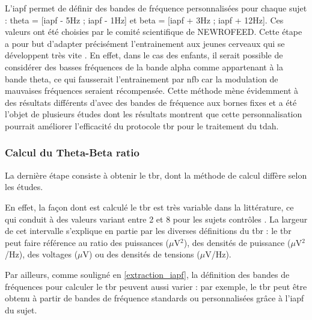 L'\gls{iapf} permet de définir des bandes de fréquence personnalisées pour chaque sujet : theta = [\gls{iapf} - 5Hz ; \gls{iapf} - 1Hz] et beta = [\gls{iapf} + 3Hz ; \gls{iapf} + 12Hz].
Ces valeurs ont été choisies par le comité scientifique de NEWROFEED.
Cette étape a pour but d'adapter précisément l'entrainement aux jeunes cerveaux qui se développent très vite \citep{Aurlien2004}. En effet, dans le cas des enfants, il serait possible de considérer 
des basses fréquences de la bande alpha comme appartenant à la bande theta, ce qui fausserait l'entrainement par \gls{nfb} car la modulation de mauvaises fréquences 
seraient récompensée. Cette méthode mène évidemment à des résultats différents d'avec des bandes de fréquence aux bornes fixes \citep{Arns2008, Vollebregt2015} et a été 
l'objet de plusieurs études \citep{Kaiser2001, Bazanova2006, Vollebregt2015} dont les résultats montrent que cette personnalisation pourrait améliorer l'efficacité du protocole
\gls{tbr} pour le traitement du \gls{tdah}.

\subsubsection{Calcul du Theta-Beta ratio} \label{tbr_computation}
La dernière étape consiste à obtenir le \gls{tbr}, dont la méthode de calcul diffère selon les études.

En effet, la façon dont est calculé le \gls{tbr} est très variable dans la littérature, ce qui conduit à des valeurs variant entre 2 et 8 pour les sujets contrôles \citep{Arns2012,
Schutte2017}. La largeur de cet intervalle s'explique en partie par les diverses définitions du \gls{tbr} : le \gls{tbr} peut faire référence au ratio
des puissances ($\mu$V$^2$), des densités de puissance ($\mu$V$^2$/Hz), des voltages ($\mu$V) ou des densités de tensions ($\mu$V/Hz).  

Par ailleurs, comme souligné en \ref{extraction_iapf}, la définition des bandes de fréquences pour calculer le \gls{tbr} peuvent aussi varier : par exemple, le \gls{tbr} peut être obtenu à partir
de bandes de fréquence standards ou personnalisées grâce à l'\gls{iapf} du sujet. 

